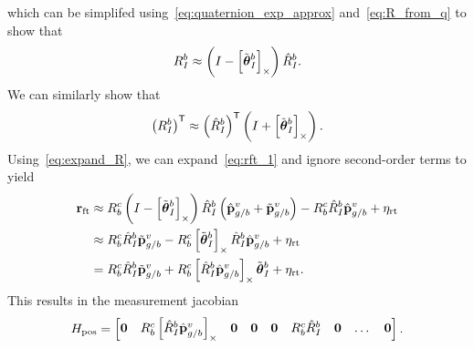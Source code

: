 which can be simplifed using~\eqref{eq:quaternion_exp_approx}
and~\eqref{eq:R_from_q} to show that
\begin{equation}
  R_I^b \approx \left( I - \skewmat{\tilde{\vect{\theta}}_I^b }\right) \hat{R}_I^b.
  \label{eq:expand_R}
\end{equation}
We can similarly show that 
\begin{equation}
  \left( R_I^b \right)^{\mathsf{T}} \approx \left( \hat{R}_I^b \right)^{\mathsf{T}}
  \left( I + \left[ \tilde{\boldsymbol{\mathrm{\theta}}}_I^b  \right]_{\times}\right).
\end{equation}
Using~\eqref{eq:expand_R}, we can expand~\eqref{eq:rft_1} and ignore
second-order terms to yield
\begin{align*}
   \boldsymbol{\mathrm{r}}_{\text{ft}} &\approx R_b^c \left( I - \left[ \tilde{\boldsymbol{\mathrm{\theta}}}_I^b  \right]_{\times}\right) \hat{R}_I^b \left( \hat{\boldsymbol{\mathrm{p}}}_{g/b}^v + \tilde{\boldsymbol{\mathrm{p}}}_{g/b}^v \right) 
                          - R_b^c \hat{R}_I^b \hat{\boldsymbol{\mathrm{p}}}_{g/b}^v +
                          \eta_{\text{rt}} \\
  &\approx R_b^c \hat{R}_I^b \tilde{\boldsymbol{\mathrm{p}}}_{g/b}^v -
  R_b^c \left[ \tilde{\boldsymbol{\mathrm{\theta}}}_I^b  \right]_{\times} \hat{R}_I^b \hat{\boldsymbol{\mathrm{p}}}_{g/b}^v 
      + \eta_{\text{rt}} \\
&= R_b^c \hat{R}_I^b \tilde{\boldsymbol{\mathrm{p}}}_{g/b}^v + R_b^c \left[ \hat{R}_I^b \hat{\boldsymbol{\mathrm{p}}}_{g/b}^v \right]_{\times} \tilde{\boldsymbol{\mathrm{\theta}}}_I^b 
      + \eta_{\text{rt}}.
\end{align*}
This results in the measurement jacobian
\begin{equation*}
  H_{\text{pos}} =
  \begin{bmatrix}
    \boldsymbol{\mathrm{0}} & R_b^c \left[  \hat{R}_I^b \hat{\boldsymbol{\mathrm{p}}}_{g/b}^v  \right]_{\times} & \boldsymbol{\mathrm{0}} &
    \boldsymbol{\mathrm{0}} & \boldsymbol{\mathrm{0}} & R_b^c \hat{R}_I^b & \boldsymbol{\mathrm{0}} & \dots & \boldsymbol{\mathrm{0}}
  \end{bmatrix}.
\end{equation*}




